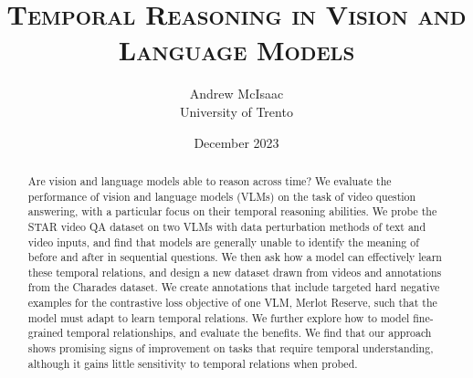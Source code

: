 \documentclass[12pt]{article}
\title{\textsc{Temporal Reasoning in Vision and Language Models}}
\date{December 2023}
\author{Andrew McIsaac\\ University of Trento}
\begin{document}

\maketitle

\begin{abstract}
	Are vision and language models able to reason across time? We evaluate the
	performance of vision and language models (VLMs) on the task of video
	question answering, with a particular focus on their temporal reasoning
	abilities. We probe the STAR video QA dataset on two VLMs with data
	perturbation methods of text and video inputs, and find that models are
	generally unable to identify the meaning of before and after in sequential
	questions. We then ask how a model can effectively learn these temporal
	relations, and design a new dataset drawn from videos and annotations from
	the Charades dataset. We create annotations that include targeted hard
	negative examples for the contrastive loss objective of one VLM, Merlot
	Reserve, such that the model must adapt to learn temporal relations. We
	further explore how to model fine-grained temporal relationships, and
	evaluate the benefits. We find that our approach shows promising signs of
	improvement on tasks that require temporal understanding, although it gains
	little sensitivity to temporal relations when probed.
\end{abstract}
\end{document}
